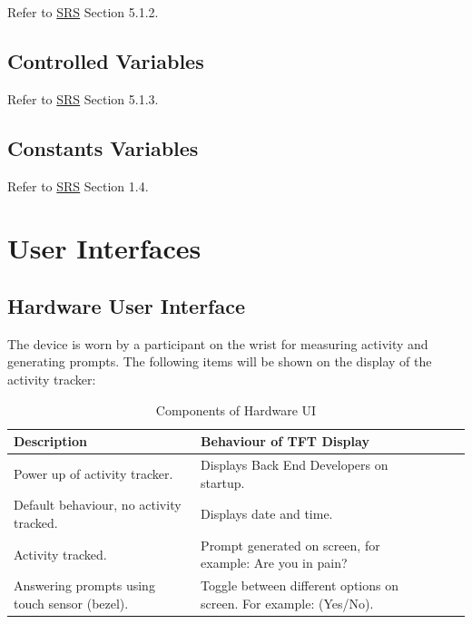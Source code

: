 \documentclass[12pt, titlepage]{article}
\begin{document}
Refer to \href{https://github.com/zakerl/Capstone_Project/blob/main/docs/SRS/SRS.pdf}{SRS} Section 5.1.2.
\subsection{Controlled Variables}

Refer to \href{https://github.com/zakerl/Capstone_Project/blob/main/docs/SRS/SRS.pdf}{SRS} Section 5.1.3.

\subsection{Constants Variables}

Refer to \href{https://github.com/zakerl/Capstone_Project/blob/main/docs/SRS/SRS.pdf}{SRS} Section 1.4.
\section{User Interfaces}


\subsection{Hardware User Interface}

The device is worn by a participant on the wrist for measuring activity and generating  prompts. The following items will be shown on the display of the activity tracker:
\begin{table}[H]
	\begin{tabularx}{1.05\textwidth} { 
		  | >{\centering\arraybackslash}X 
		  | >{\centering\arraybackslash}X 
		  | >{\centering\arraybackslash}X 
		  | >{\centering\arraybackslash}X | }
		 \hline
		 \textbf{Description} & \textbf{Behaviour of TFT Display} \\
		 \hline
		Power up of activity tracker. & Displays Back End Developers on startup.\\
		\hline
		 Default behaviour, no activity tracked.  & Displays date and time.\\
		 \hline
		   Activity tracked. & Prompt generated on screen, for example: Are you in pain?\\
		\hline 
		Answering prompts using touch sensor (bezel). & Toggle between different 				options on screen. For example: (Yes/No).\\
		\hline
	\end{tabularx}
\caption{\label{Hardware User Interface}Components of Hardware UI}  
\end{table}
\end{document}
